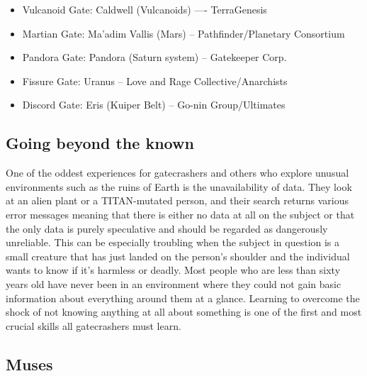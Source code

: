 \begin{itemize}
\item Vulcanoid Gate: Caldwell (Vulcanoids) —- TerraGenesis
\item Martian Gate: Ma’adim Vallis (Mars) -- Pathfinder/Planetary
  Consortium
\item Pandora Gate: Pandora (Saturn system) -- Gatekeeper Corp.
\item Fissure Gate: Uranus -- Love and Rage Collective/Anarchists
\item Discord Gate: Eris (Kuiper Belt) -- Go-nin Group/Ultimates
\end{itemize}

\subsection{Going beyond the known}
\label{sec:going-beyond-known}

One of the oddest experiences for gatecrashers and others who explore
unusual environments such as the ruins of Earth is the unavailability
of data. They look at an alien plant or a TITAN-mutated person, and
their search returns various error messages meaning that there is
either no data at all on the subject or that the only data is purely
speculative and should be regarded as dangerously unreliable. This can
be especially troubling when the subject in question is a small
creature that has just landed on the person's shoulder and the
individual wants to know if it's harmless or deadly. Most people who
are less than sixty years old have never been in an environment where
they could not gain basic information about everything around them at
a glance. Learning to overcome the shock of not knowing anything at
all about something is one of the first and most crucial skills all
gatecrashers must learn.

\subsection{Muses}
\label{sec:muses}

